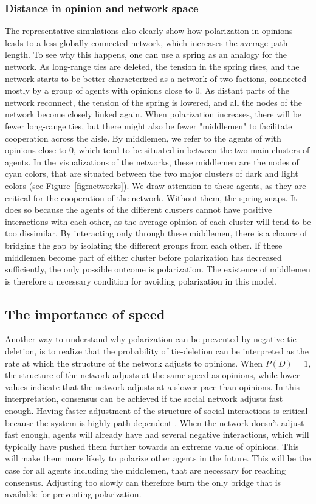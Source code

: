 \documentclass[11pt]{article}
\begin{document}
\subsubsection{Distance in opinion and network space}
\noindent The representative simulations also clearly show how polarization in opinions leads to a less globally connected network, which increases the average path length. To see why this happens, one can use a spring as an analogy for the network. As long-range ties are deleted, the tension in the spring rises, and the network starts to be better characterized as a network of two factions, connected mostly by a group of agents with opinions close to 0. As distant parts of the network reconnect, the tension of the spring is lowered, and all the nodes of the network become closely linked again. When polarization increases, there will be fewer long-range ties, but there might also be fewer "middlemen" to facilitate cooperation across the aisle. By middlemen, we refer to the agents of with opinions close to 0, which tend to be situated in between the two main clusters of agents. In the visualizations of the networks, these middlemen are the nodes of cyan colors, that are situated between the two major clusters of dark and light colors (see Figure~\ref{fig:networks}). We draw attention to these agents, as they are critical for the cooperation of the network. Without them, the spring snaps. It does so because the agents of the different clusters cannot have positive interactions with each other, as the average opinion of each cluster will tend to be too dissimilar. By interacting only through these middlemen, there is a chance of bridging the gap by isolating the different groups from each other. If these middlemen become part of either cluster before polarization has decreased sufficiently, the only possible outcome is polarization. The existence of middlemen is therefore a necessary condition for avoiding polarization in this model. 

\subsection{The importance of speed}
\noindent Another way to understand why polarization can be prevented by negative tie-deletion, is to realize that the probability of tie-deletion can be interpreted as the rate at which the structure of the network adjusts to opinions. When $P(D) = 1$, the structure of the network adjusts at the same speed as opinions, while lower values indicate that the network adjusts at a slower pace than opinions. In this interpretation, consensus can be achieved if the social network adjusts fast enough. Having faster adjustment of the structure of social interactions is critical because the system is highly path-dependent \cite{turner_paths_2018, macy2021polarization}.  When the network doesn't adjust fast enough, agents will already have had several negative interactions, which will typically have pushed them further towards an extreme value of opinions. This will make them more likely to polarize other agents in the future. This will be the case for all agents including the middlemen, that are necessary for reaching consensus. Adjusting too slowly can therefore burn the only bridge that is available for preventing polarization.  
\end{document}
